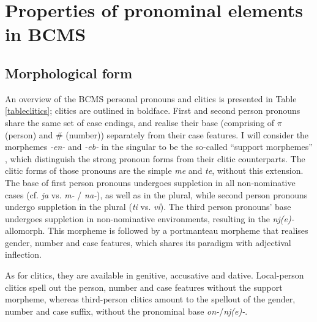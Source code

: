 \documentclass[output=paper,colorlinks,citecolor=brown]{langscibook}
\begin{document}
\section{Properties of pronominal elements in BCMS}\label{pus:sec:propertiesofpronominalelements}

\subsection{Morphological form}\label{subsec:morphologicalform}

An overview of the BCMS personal pronouns and clitics is presented in Table \ref{tableclitics}; clitics are outlined in boldface. First and second person pronouns share the same set of case endings, and realise their base (comprising of $\pi$ (person) and \# (number)) separately from their case features. I will consider the morphemes \textit{-en-}  and \textit{-eb-} in the singular to be the so-called ``support morphemes''  \citep{cardinalettistarke}, which distinguish the strong pronoun forms from their clitic counterparts. The clitic forms of those pronouns are the simple \textit{me} and \textit{te}, without this extension. The base of first person pronouns undergoes suppletion in all non-nominative cases (cf. \textit{ja} vs. \textit{m-} /  \textit{na-}), as well as in the plural, while second person pronouns undergo suppletion in the plural (\textit{ti} vs. \textit{vi}). 		
The third person pronouns' base undergoes suppletion in non-nominative environments, resulting in the \textit{nj(e)-} allomorph. This morpheme is followed by a portmanteau morpheme that realises gender, number and case features, which shares its paradigm with adjectival inflection.  

As for clitics, they are available in genitive, accusative and dative. Local-person clitics spell out the person, number and case features without the support morpheme, whereas third-person clitics amount to the spellout of the gender, number and case suffix, without the pronominal base \textit{on-}/\textit{nj(e)-}.
\end{document}
